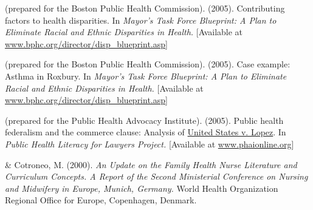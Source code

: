 \documentclass[10pt,]{article}
\begin{document}
{{{{{{{{{{{{{{{\begin{hangparas}{.25in}{1}
\end{hangparas}



\begin{hangparas}{.25in}{1}

 (prepared for the Boston Public Health Commission). (2005). Contributing factors to health disparities. In {\textit {Mayor’s Task Force Blueprint: A Plan to Eliminate Racial and Ethnic Disparities in Health.}} [Available at \href{http://www.bphc.org/director/disp_blueprint.asp}{\ttfamily www.bphc.org/director/disp\_blueprint.asp}]

\end{hangparas}



\begin{hangparas}{.25in}{1}

 (prepared for the Boston Public Health Commission). (2005). Case example: Asthma in Roxbury. In {\textit {Mayor’s Task Force Blueprint: A Plan to Eliminate Racial and Ethnic Disparities in Health.}} [Available at \href{http://www.bphc.org/director/disp_blueprint.asp}{\ttfamily www.bphc.org/director/disp\_blueprint.asp}]

\end{hangparas}



\begin{hangparas}{.25in}{1}

 (prepared for the Public Health Advocacy Institute). (2005). Public health federalism and the commerce clause: Analysis of {\underline {United States v. Lopez}}. In {\textit {Public Health Literacy for Lawyers Project.}} [Available at \href{http://www.phaionline.org}{\ttfamily www.phaionline.org}]

\end{hangparas}



\begin{hangparas}{.25in}{1}

 \& Cotroneo, M. (2000). {\textit {An Update on the Family Health Nurse Literature and Curriculum Concepts. A Report of the Second Ministerial Conference on Nursing and Midwifery in Europe, Munich, Germany.}} World Health Organization Regional Office for Europe, Copenhagen, Denmark.

\end{hangparas}



}}}}}}}}}}}}}}}
\end{document}
